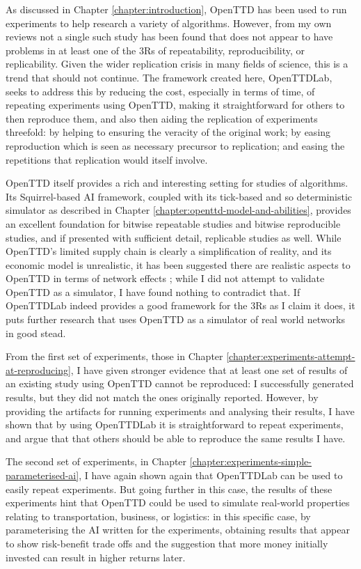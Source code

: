 \documentclass[logo,msc,dsti]{style/infthesis}    %
\begin{document}
{As discussed in Chapter \ref{chapter:introduction}, OpenTTD has been used to run experiments to help research a variety of algorithms. However, from my own reviews not a single such study has been found that does not appear to have problems in at least one of the 3Rs of repeatability, reproducibility, or replicability. Given the wider replication crisis in many fields of science, this is a trend that should not continue. The framework created here, OpenTTDLab, seeks to address this by reducing the cost, especially in terms of time, of repeating experiments using OpenTTD, making it straightforward for others to then reproduce them, and also then aiding the replication of experiments threefold: by helping to ensuring the veracity of the original work; by easing reproduction which is seen as necessary precursor to replication; and easing the repetitions that replication would itself involve.

OpenTTD itself provides a rich and interesting setting for studies of algorithms. Its Squirrel-based AI framework, coupled with its tick-based and so deterministic simulator as described in Chapter \ref{chapter:openttd-model-and-abilities}, provides an excellent foundation for bitwise repeatable studies and bitwise reproducible studies, and if presented with sufficient detail, replicable studies as well. While OpenTTD's limited supply chain is clearly a simplification of reality, and its economic model is unrealistic, it has been suggested there are realistic aspects to OpenTTD in terms of network effects \cite{raghothama2013review}; while I did not attempt to validate OpenTTD as a simulator, I have found nothing to contradict that. If OpenTTDLab indeed provides a good framework for the 3Rs as I claim it does, it puts further research that uses OpenTTD as a simulator of real world networks in good stead.

From the first set of experiments, those in Chapter \ref{chapter:experiments-attempt-at-reproducing}, I have given stronger evidence that at least one set of results of an existing study using OpenTTD cannot be reproduced: I successfully generated results, but they did not match the ones originally reported. However, by providing the artifacts for running experiments and analysing their results, I have shown that by using OpenTTDLab it is straightforward to repeat experiments, and argue that that others should be able to reproduce the same results I have.

The second set of experiments, in Chapter \ref{chapter:experiments-simple-parameterised-ai}, I have again shown again that OpenTTDLab can be used to easily repeat experiments. But going further in this case, the results of these experiments hint that OpenTTD could be used to simulate real-world properties relating to transportation, business, or logistics: in this specific case, by parameterising the AI written for the experiments, obtaining results that appear to show risk-benefit trade offs and the suggestion that more money initially invested can result in higher returns later.

}
\end{document}
